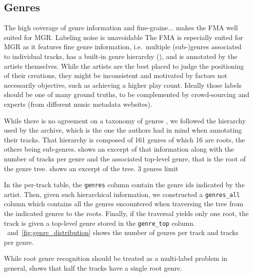 \documentclass{article}
\newcommand{\todo}[1]{{\color{red} #1}}
\newcommand{\ngenres}{161 }
\begin{document}
\subsection{Genres}

\todo{The high coverage of genre information and fine-graine... makes the FMA well suited for MGR.}
Labeling noise is unavoidable
The FMA is especially suited for MGR as it features fine genre information, i.e.\ multiple (sub-)genres associated to individual tracks, has a built-in genre hierarchy (), and is annotated by the artists themselves. While the artists are the best placed to judge the positioning of their creations, they might be inconsistent and motivated by factors not necessarily objective, such as achieving a higher play count. Ideally those labels should be one of many ground truths, to be complemented by crowd-sourcing and experts (from different music metadata websites).

While there is no agreement on a taxonomy of genres \cite{mir_review_genre}, we followed the hierarchy used by the archive, which is the one the authors had in mind when annotating their tracks. That hierarchy is composed of \ngenres genres of which 16 are roots, the others being sub-genres.  shows an excerpt of that information along with the number of tracks per genre and the associated top-level genre, that is the root of the genre tree.  shows an excerpt of the tree.
\todo{3 genres limit}

In the per-track table, the \texttt{genres} column contain the genre ids indicated by the artist. Then, given such hierarchical information, we constructed a \texttt{genres\_all} column which contains all the genres encountered when traversing the tree from the indicated genres to the roots. Finally, if the traversal yields only one root, the track is given a top-level genre stored in the \texttt{genre\_top} column.
~and~\ref{fig:genre_distribution} shows the number of genres per track and tracks per genre.

While root genre recognition should be treated as a multi-label problem in general,  shows that half the tracks have a single root genre.

\end{document}
